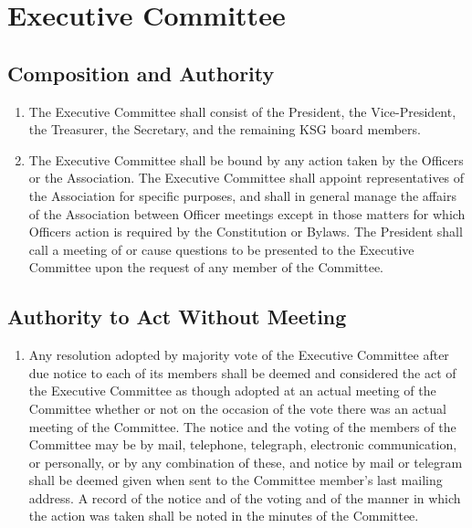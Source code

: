 \documentclass[12pt,letterpaper]{article}
\begin{document}
\section{Executive Committee}

\subsection{Composition and Authority}
\begin{enumerate}
  \item The Executive Committee shall consist of the President, the Vice-President, the
        Treasurer, the Secretary, and the remaining KSG board members.
  \item The Executive Committee shall be bound by any action taken by the Officers or
        the Association. The Executive Committee shall appoint representatives of the
        Association for specific purposes, and shall in general manage the affairs of
        the Association between Officer meetings except in those matters for which
        Officers action is required by the Constitution or Bylaws. The President shall
        call a meeting of or cause questions to be presented to the Executive
        Committee upon the request of any member of the Committee.
\end{enumerate}

\subsection{Authority to Act Without Meeting}
\begin{enumerate}
  \item Any resolution adopted by majority vote of the Executive Committee after
        due notice to each of its members shall be deemed and considered the act
        of the Executive Committee as though adopted at an actual meeting of the
        Committee whether or not on the occasion of the vote there was an actual
        meeting of the Committee. The notice and the voting of the members
        of the Committee may be by mail, telephone, telegraph, electronic
        communication, or personally, or by any combination of these, and notice by
        mail or telegram shall be deemed given when sent to the Committee member's
        last mailing address. A record of the notice and of the voting and of the
        manner in which the action was taken shall be noted in the minutes of the
        Committee.
\end{enumerate}
\end{document}
